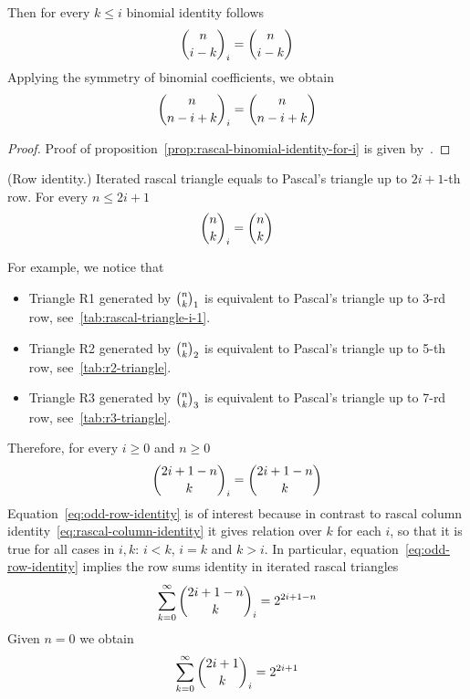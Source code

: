 Then for every $k \leq i$ binomial identity follows
\begin{align*}
    \binom{n}{i-k}_{i} = \binom{n}{i-k}
\end{align*}
Applying the symmetry of binomial coefficients, we obtain
\begin{align*}
    \binom{n}{n-i+k}_{i} = \binom{n}{n-i+k}
\end{align*}
\begin{proof}
    Proof of proposition~\eqref{prop:rascal-binomial-identity-for-i}
    is given by~\cite[proposition 6.0.1]{gregory2022iterated_thesis}.
\end{proof}
\begin{proposition}
    \label{prop:odd-row-proposition}
    (Row identity.)
    Iterated rascal triangle equals to Pascal's triangle up to $2i+1$-th row.
    For every $n \leq 2i+1$
    \begin{align*}
        \binom{n}{k}_{i} = \binom{n}{k}
    \end{align*}
\end{proposition}
For example, we notice that
\begin{itemize}
    \item Triangle R1 generated by $\binom{n}{k}_{1}$ is equivalent to Pascal's triangle up to 3-rd row, see~\eqref{tab:rascal-triangle-i-1}.
    \item Triangle R2 generated by $\binom{n}{k}_{2}$ is equivalent to Pascal's triangle up to 5-th row, see~\eqref{tab:r2-triangle}.
    \item Triangle R3 generated by $\binom{n}{k}_{3}$ is equivalent to Pascal's triangle up to 7-rd row, see~\eqref{tab:r3-triangle}.
\end{itemize}
Therefore, for every $i \geq 0$ and $n \geq 0$
\begin{equation}
    \binom{2i+1-n}{k}_{i} = \binom{2i+1-n}{k}
    \label{eq:odd-row-identity}
\end{equation}
Equation~\eqref{eq:odd-row-identity} is of interest because in contrast to rascal
column identity~\eqref{eq:rascal-column-identity} it gives relation over $k$ for each $i$,
so that it is true for all cases in $i,k$: $i < k$, $i=k$ and $k >i$.
In particular, equation~\eqref{eq:odd-row-identity} implies the row sums identity in iterated rascal triangles
\begin{align*}
    \sum_{k=0}^{\infty} \binom{2i+1-n}{k}_{i} = 2^{2i+1-n}
\end{align*}
Given $n=0$ we obtain
\begin{align*}
    \sum_{k=0}^{\infty} \binom{2i+1}{k}_{i} = 2^{2i+1}
\end{align*}
